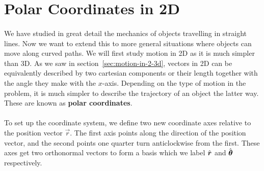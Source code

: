 \documentclass[../classical_mechanics.tex]{subfiles}
\begin{document}
    \section{Polar Coordinates in 2D}
        \paragraph{}
        We have studied in great detail the mechanics of objects travelling in straight lines.
        Now we want to extend this to more general situations where objects can move along curved paths.
        We will first study motion in 2D as it is much simpler than 3D.
        As we saw in section~\ref{sec:motion-in-2-3d}, vectors in 2D can be equivalently described by two cartesian components or their length together with the angle they make with the $x$-axis.
        Depending on the type of motion in the problem, it is much simpler to describe the trajectory of an object the latter way.
        These are known as \textbf{polar coordinates}.

        \paragraph{}
        To set up the coordinate system, we define two new coordinate axes relative to the position vector $\vec{r}$.
        The first axis points along the direction of the position vector, and the second points one quarter turn anticlockwise from the first.
        These axes get two orthonormal vectors to form a basis which we label $\hat{\boldsymbol{r}}$ and $\hat{\boldsymbol{\theta}}$ respectively.
        \begin{figure}[H]
            \centering
        \end{figure}
\end{document}
